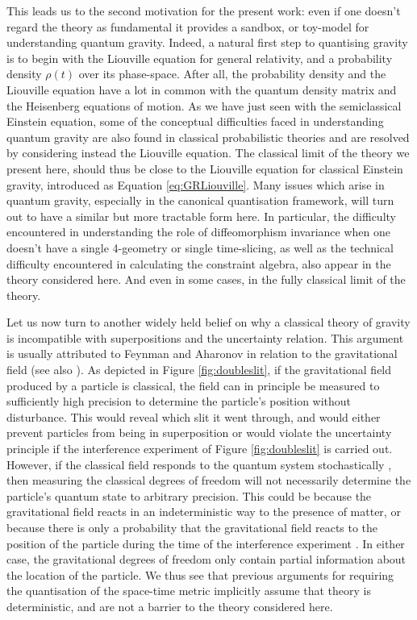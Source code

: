 \documentclass[aps,pra,showpacs,citeautoscript,amsmath,amssymb,floatfix,superscriptaddress,bbm, verbatim,amsfonts,changes,11pt,nofootinbib,longbibliography]{revtex4-2}
\begin{document}
This leads us to the second motivation for the present work: even if one doesn't regard the theory as fundamental it provides a sandbox, or toy-model for understanding quantum gravity.  Indeed, a natural first step to quantising gravity is to begin with the Liouville equation for general relativity, and a probability density $\rho(t)$ over its phase-space.  After all, the probability density and the Liouville equation have a lot in common with the quantum density matrix and the Heisenberg equations of motion. As we have just seen with the semiclassical Einstein equation, some of the conceptual difficulties faced in understanding quantum gravity are also found in classical probabilistic theories and are resolved by considering instead the Liouville equation. The classical limit of the theory we present here, should thus be close to the Liouville equation for classical Einstein gravity, introduced as Equation \eqref{eq:GRLiouville}.
Many issues which arise in quantum gravity, especially in the canonical quantisation framework, will turn out to have a similar but more tractable form here. In particular, the difficulty encountered in understanding the role of diffeomorphism invariance when one doesn't have a single 4-geometry or single time-slicing, as well as the technical difficulty encountered in calculating the constraint algebra, also appear in the theory considered here. And even in some cases, in the fully classical limit of the theory.


Let us now turn to another widely held belief on why a classical theory of gravity is incompatible with superpositions and the uncertainty relation. This argument is usually attributed to Feynman \cite{cecile2011role,Feynman:1996kb-note} and Aharonov \cite{AharonovParadoxes-note} in relation to the gravitational field (see also  \cite{eppley1977necessity,Mari:2015qva,Baym3035,belenchia2018quantum,signal_foot}). As depicted in Figure \ref{fig:doubleslit}, if the gravitational field produced by a particle is classical, the field can in principle be measured to sufficiently high precision  
to determine the particle's position without disturbance. This would reveal which slit it went through, and would either prevent particles from being in superposition or would violate the uncertainty principle if the interference experiment of Figure \ref{fig:doubleslit} is carried out.  However, if the classical field responds to the quantum system stochastically\label{par:stochastic} \cite{hustochasticgravity_foot}, then measuring the classical degrees of freedom will not necessarily determine the particle's quantum state to arbitrary precision. This could be because the gravitational field reacts in an indeterministic way to the presence of matter,  or because there is only a probability that the gravitational field reacts to the position of the particle during the time of the interference experiment \cite{experiment_foot}. In either case, the gravitational degrees of freedom only contain partial information about the location of the particle. We thus see that previous arguments for requiring the quantisation of the space-time metric implicitly assume that theory is deterministic, and are not a barrier to the theory considered here.
\end{document}
